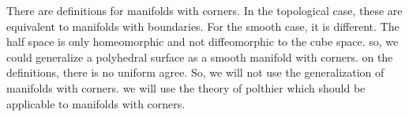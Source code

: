 \documentclass{stdlocal}
\begin{document}
  There are definitions for manifolds with corners.
  In the topological case, these are equivalent to manifolds with boundaries.
  For the smooth case, it is different.
  The half space is only homeomorphic and not diffeomorphic to the cube space.
  so, we could generalize a polyhedral surface as a smooth manifold with corners.
  on the definitions, there is no uniform agree.
  So, we will not use the generalization of manifolds with corners.
  we will use the theory of polthier which should be applicable to manifolds with corners.





\end{document}
